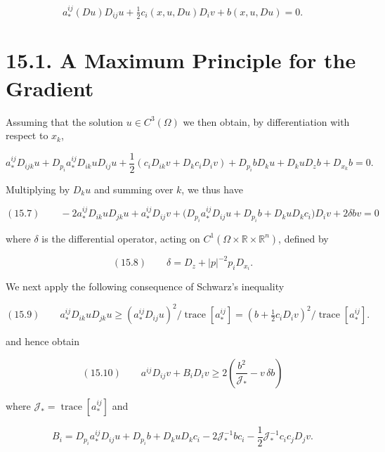 \[
a_*^{ij}(Du)D_{ij}u+\tfrac12 c_i(x,u,Du)D_iv+b(x,u,Du)=0.
\]




\section*{15.1. A Maximum Principle for the Gradient}

Assuming that the solution $u \in C^3(\Omega)$ we then obtain, by differentiation with respect to $x_k$,

\begin{equation*}
a_*^{ij}D_{ijk}u + D_{p_i}a_*^{ij}D_{ik}uD_{ij}u+\frac12(c_iD_{ik}v+D_kc_iD_iv)
+ D_{p_i}bD_ku + D_kuD_zb + D_{x_k}b = 0.
\end{equation*}

Multiplying by $D_ku$ and summing over $k$, we thus have

\begin{equation}
(15.7)\qquad -2a_*^{ij}D_{ik}uD_{jk}u+a_*^{ij}D_{ij}v+\bigl(D_{p_i}a_*^{ij}D_{ij}u+D_{p_i}b+D_kuD_kc_i\bigr)D_iv+2\delta bv=0
\end{equation}

where $\delta$ is the differential operator, acting on $C^1(\Omega\times \mathbb{R}\times \mathbb{R}^n)$, defined by

\begin{equation}
(15.8)\qquad \delta=D_z+|p|^{-2}p_iD_{x_i}.
\end{equation}

We next apply the following consequence of Schwarz's inequality

\begin{equation}
(15.9)\qquad a_*^{ij}D_{ik}uD_{jk}u\ge (a_*^{ij}D_{ij}u)^2/\operatorname{trace}[a_*^{ij}]
=(b+\tfrac12c_iD_iv)^2/\operatorname{trace}[a_*^{ij}].
\end{equation}

and hence obtain

\begin{equation}
(15.10)\qquad a^{ij}D_{ij}v+B_iD_iv\ge 2\left(\frac{b^2}{\mathcal{J}_*}-v\,\delta b\right)
\end{equation}

where $\mathcal{J}_*=\operatorname{trace}[a_*^{ij}]$ and

\[
B_i=D_{p_i}a_*^{ij}D_{ij}u+D_{p_i}b+D_kuD_kc_i-2\mathcal{J}_*^{-1}bc_i-\frac12\mathcal{J}_*^{-1}c_ic_jD_jv.
\]

